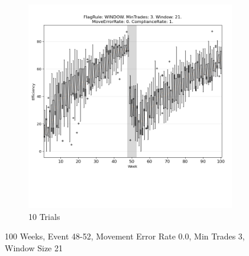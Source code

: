 \documentclass{article}%
\begin{document}
\begin{figure}[!htb]
\begin{subfigure}[b]{0.45\linewidth}
\includegraphics[clip,width=\linewidth,trim=0 4cm 0 0]{0057fr_WINDOW_mt_3_ws_21_er_0_cr_1_t10.png}%
\caption{10 Trials}%
\end{subfigure}%
\caption{100 Weeks, Event 48{-}52, Movement Error Rate 0.0, Min Trades 3, Window Size 21}%
\end{figure}

%
\end{document}
